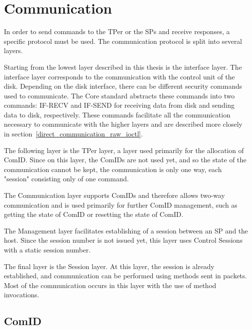 \section{Communication}
\label{opal_communication}

In order to send commands to the TPer or the SPs and receive responses, a specific protocol must be used. 
The communication protocol is split into several layers.

Starting from the lowest layer described in this thesis is the interface layer. The interface layer corresponds to the communication with the control unit of the disk. Depending on the disk interface, there can be different security commands used to communicate. The Core standard abstracts these commands into two commands: IF-RECV and IF-SEND for receiving data from disk and sending data to disk, respectively. These commands facilitate all the communication necessary to communicate with the higher layers and are described more closely in section~\ref{direct_communication_raw_ioctl}.

The following layer is the TPer layer, a layer used primarily for the allocation of ComID. Since on this layer, the ComIDs are not used yet, and so the state of the communication cannot be kept, the communication is only one way, each "session" consisting only of one command.

The Communication layer supports ComIDs and therefore allows two-way communication and is used primarily for further ComID management, such as getting the state of ComID or resetting the state of ComID.

The Management layer facilitates establishing of a session between an SP and the host. Since the session number is not issued yet, this layer uses Control Sessions with a static session number.

The final layer is the Session layer. At this layer, the session is already established, and communication can be performed using methods sent in packets. Most of the communication occurs in this layer with the use of method invocations.

\subsection{ComID}

